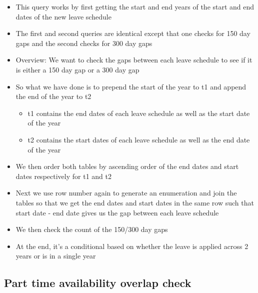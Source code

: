 \documentclass[
  paper=a4,
  ,captions=tableheading
]{scrartcl}
\providecommand{\tightlist}{%
  \setlength{\itemsep}{0pt}\setlength{\parskip}{0pt}}
\begin{document}
\begin{itemize}
\tightlist
\item
  This query works by first getting the start and end years of the start
  and end dates of the new leave schedule
\item
  The first and second queries are identical except that one checks for
  150 day gaps and the second checks for 300 day gaps
\item
  Overview: We want to check the gaps between each leave schedule to see
  if it is either a 150 day gap or a 300 day gap
\item
  So what we have done is to prepend the start of the year to t1 and
  append the end of the year to t2

  \begin{itemize}
  \tightlist
  \item
    t1 contains the end dates of each leave schedule as well as the
    start date of the year
  \item
    t2 contains the start dates of each leave schedule as well as the
    end date of the year
  \end{itemize}
\item
  We then order both tables by ascending order of the end dates and
  start dates respectively for t1 and t2
\item
  Next we use row number again to generate an enumeration and join the
  tables so that we get the end dates and start dates in the same row
  such that start date - end date gives us the gap between each leave
  schedule
\item
  We then check the count of the 150/300 day gaps
\item
  At the end, it's a conditional based on whether the leave is applied
  across 2 years or is in a single year
\end{itemize}

\hypertarget{part-time-availability-overlap-check}{%
\subsection{Part time availability overlap
check}\label{part-time-availability-overlap-check}}
\end{document}
